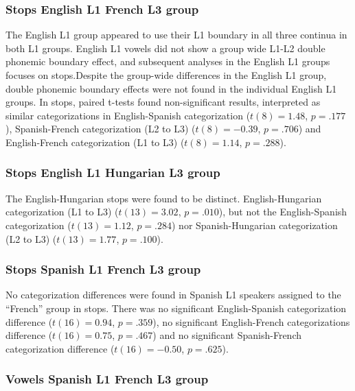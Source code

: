 \documentclass[
  english,
  man]{apa6}
\begin{document}
\hypertarget{stops-english-l1-french-l3-group}{%
\subsubsection{Stops English L1 French L3 group}\label{stops-english-l1-french-l3-group}}

The English L1 group appeared to use their L1 boundary in all three continua in both L1 groups. English L1 vowels did not show a group wide L1-L2 double phonemic boundary effect, and subsequent analyses in the English L1 groups focuses on stops.Despite the group-wide differences in the English L1 group, double phonemic boundary effects were not found in the individual English L1 groups. In stops, paired t-tests found non-significant results, interpreted as similar categorizations in English-Spanish categorization (\(t(8) = 1.48\), \(p = .177\)), Spanish-French categorization (L2 to L3) (\(t(8) = -0.39\), \(p = .706\)) and English-French categorization (L1 to L3) (\(t(8) = 1.14\), \(p = .288\)).

\hypertarget{stops-english-l1-hungarian-l3-group}{%
\subsubsection{Stops English L1 Hungarian L3 group}\label{stops-english-l1-hungarian-l3-group}}

The English-Hungarian stops were found to be distinct. English-Hungarian categorization (L1 to L3) (\(t(13) = 3.02\), \(p = .010\)), but not the English-Spanish categorization (\(t(13) = 1.12\), \(p = .284\)) nor Spanish-Hungarian categorization (L2 to L3) (\(t(13) = 1.77\), \(p = .100\)).

\hypertarget{stops-spanish-l1-french-l3-group}{%
\subsubsection{Stops Spanish L1 French L3 group}\label{stops-spanish-l1-french-l3-group}}

No categorization differences were found in Spanish L1 speakers assigned to the ``French'' group in stops. There was no significant English-Spanish categorization difference (\(t(16) = 0.94\), \(p = .359\)), no significant English-French categorizations difference (\(t(16) = 0.75\), \(p = .467\)) and no significant Spanish-French categorization difference (\(t(16) = -0.50\), \(p = .625\)).

\hypertarget{vowels-spanish-l1-french-l3-group}{%
\subsubsection{Vowels Spanish L1 French L3 group}\label{vowels-spanish-l1-french-l3-group}}
\end{document}
